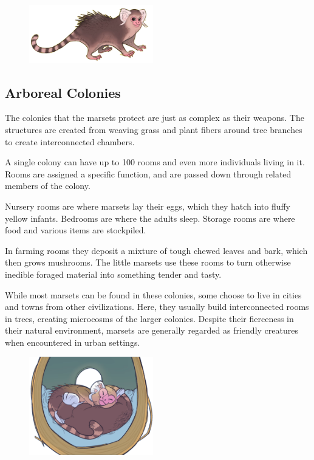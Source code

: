 \begin{figure}[!b]
    \centering
    \includegraphics[width=0.48\textwidth]{04kins/img/13marset_brown.png}
\end{figure}

\subsection*{Arboreal Colonies}
    The colonies that the marsets protect are just as complex as their weapons.
    The structures are created from weaving grass and plant fibers around tree branches to create interconnected chambers.

    A single colony can have up to 100 rooms and even more individuals living in it.
    Rooms are assigned a specific function, and are passed down through related members of the colony.

    Nursery rooms are where marsets lay their eggs, which they hatch into fluffy yellow infants.
    Bedrooms are where the adults sleep.
    Storage rooms are where food and various items are stockpiled.

    In farming rooms they deposit a mixture of tough chewed leaves and bark, which then grows mushrooms.
    The little marsets use these rooms to turn otherwise inedible foraged material into something tender and tasty.

    While most marsets can be found in these colonies, some choose to live in cities and towns from other civilizations.
    Here, they usually build interconnected rooms in trees, creating microcosms of the larger colonies.
    Despite their fierceness in their natural environment, marsets are generally regarded as friendly creatures when encountered in urban settings.

\begin{figure}[!t]
    \centering
    \includegraphics[width=0.48\textwidth]{04kins/img/13marset_room.png}
\end{figure}

